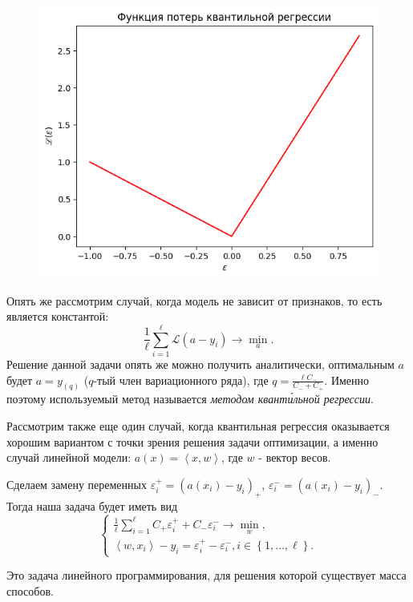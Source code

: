 \begin{figure}[h]
    \centering
    \includegraphics{chapters/nonstandart_error/images/ФПКР.png}
\end{figure}

Опять же рассмотрим случай, когда модель не зависит от признаков, то есть является константой:
$$\frac{1}{\ell}\sum\limits_{i=1}^\ell\mathscr{L}\left(a - y_i\right) \longrightarrow \min\limits_{a}.$$
Решение данной задачи опять же можно получить аналитически, оптимальным $a$ будет $a = y_{(q)}$ ($q$-тый член вариационного ряда), где $q = \frac{\ell C_-}{C_- + C_+}$.
Именно поэтому используемый метод называется \textit{методом квант\'{и}льной регрессии}.

Рассмотрим также еще один случай, когда квантильная регрессия оказывается хорошим вариантом с точки зрения решения задачи оптимизации, а именно случай линейной модели: $a(x) = \left\langle x, w \right\rangle$, где $w$ - вектор весов.

Сделаем замену переменных $\varepsilon_i^+ = (a(x_i) - y_i)_+$, $\varepsilon_i^- = (a(x_i) - y_i)_-$. Тогда наша задача будет иметь вид
$$\begin{cases}
    \frac{1}{\ell}\sum_{i=1}^\ell C_+\varepsilon_i^+ + C_-\varepsilon_i^- \longrightarrow \min\limits_{w},\\
    \left\langle w, x_i \right\rangle - y_i = \varepsilon_i^+ - \varepsilon_i^-, i \in \left\{ 1 , \dotsc, \ell \right\}.
\end{cases}$$

Это задача линейного программирования, для решения которой существует масса способов.

